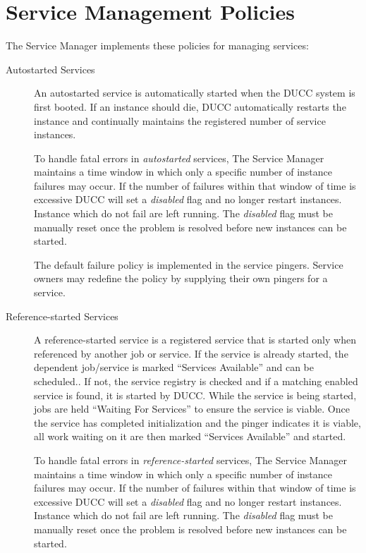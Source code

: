       \section{Service Management Policies}
      \label{sec:service.management-policy}

      The Service Manager implements these policies for managing services:
      \begin{description}

         \item[Autostarted Services] An autostarted service is automatically started when the DUCC
           system is first booted.  If an instance should die, DUCC automatically restarts the
           instance and continually maintains the registered number of service instances.

           To handle fatal errors in {\em autostarted} services, The Service Manager maintains a time
           window in which only a specific number of instance failures may occur.  If the number of
           failures within that window of time is excessive DUCC will set a {\em disabled} flag and
           no longer restart instances.  Instance which do not fail are left running.  The {\em
             disabled} flag must be manually reset once the problem is resolved before new instances
           can be started.

           The default failure policy is implemented in the service pingers. Service
           owners may redefine the policy by supplying their own pingers for a service.
          
         \item[Reference-started Services] A reference-started service is a registered service that
           is started only when referenced by another job or service. If the service is already
           started, the dependent job/service is marked ``Services Available'' and can be scheduled.. If
           not, the service registry is checked and if a matching enabled service is found, it is 
           started by DUCC.  While the service is being started, jobs are held ``Waiting For Services''
           to ensure the service is viable. Once the service has completed initialization and the pinger 
           indicates it is viable, all work waiting on it are then marked ``Services Available'' and
           started.  
          
           To handle fatal errors in {\em reference-started} services, The Service Manager maintains
           a time window in which only a specific number of instance failures may occur.  If the
           number of failures within that window of time is excessive DUCC will set a {\em disabled}
           flag and no longer restart instances.  Instance which do not fail are left running. The
           {\em disabled} flag must be manually reset once the problem is resolved before new
           instances can be started.
           

\end{description}
